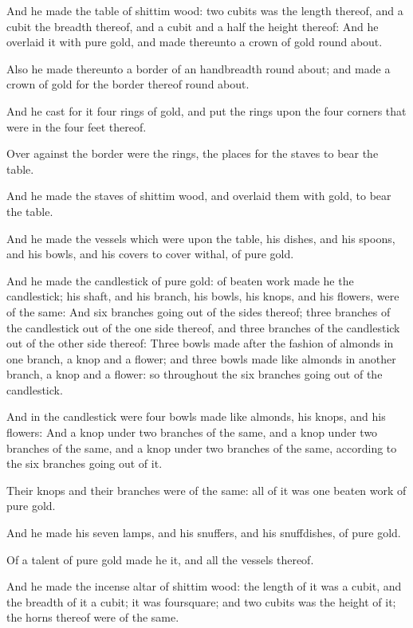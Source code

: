 \Verse And he made the table of shittim wood: two cubits was the length thereof, and a cubit the breadth thereof, and a cubit and a half the height thereof: \Verse And he overlaid it with pure gold, and made thereunto a crown of gold round about.

\Verse Also he made thereunto a border of an handbreadth round about; and made a crown of gold for the border thereof round about.

\Verse And he cast for it four rings of gold, and put the rings upon the four corners that were in the four feet thereof.

\Verse Over against the border were the rings, the places for the staves to bear the table.

\Verse And he made the staves of shittim wood, and overlaid them with gold, to bear the table.

\Verse And he made the vessels which were upon the table, his dishes, and his spoons, and his bowls, and his covers to cover withal, of pure gold.

\Verse And he made the candlestick of pure gold: of beaten work made he the candlestick; his shaft, and his branch, his bowls, his knops, and his flowers, were of the same: \Verse And six branches going out of the sides thereof; three branches of the candlestick out of the one side thereof, and three branches of the candlestick out of the other side thereof: \Verse Three bowls made after the fashion of almonds in one branch, a knop and a flower; and three bowls made like almonds in another branch, a knop and a flower: so throughout the six branches going out of the candlestick.

\Verse And in the candlestick were four bowls made like almonds, his knops, and his flowers: \Verse And a knop under two branches of the same, and a knop under two branches of the same, and a knop under two branches of the same, according to the six branches going out of it.

\Verse Their knops and their branches were of the same: all of it was one beaten work of pure gold.

\Verse And he made his seven lamps, and his snuffers, and his snuffdishes, of pure gold.

\Verse Of a talent of pure gold made he it, and all the vessels thereof.

\Verse And he made the incense altar of shittim wood: the length of it was a cubit, and the breadth of it a cubit; it was foursquare; and two cubits was the height of it; the horns thereof were of the same.

